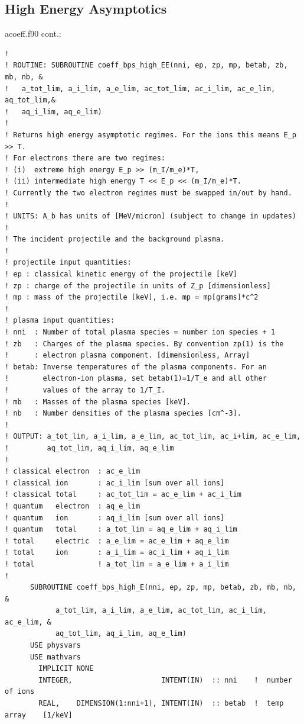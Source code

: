 \documentclass[preprint,12pt,eqsecnum,nofootinbib,amsmath,amssymb]{revtex4}
\begin{document}
\subsection{High Energy Asymptotics}

\vskip1cm 
\noindent
acoeff.f90 cont.:
{
\baselineskip 10pt
\begin{verbatim}
! 
! ROUTINE: SUBROUTINE coeff_bps_high_EE(nni, ep, zp, mp, betab, zb, mb, nb, &
!   a_tot_lim, a_i_lim, a_e_lim, ac_tot_lim, ac_i_lim, ac_e_lim, aq_tot_lim,&
!   aq_i_lim, aq_e_lim)
!
! Returns high energy asymptotic regimes. For the ions this means E_p >> T.
! For electrons there are two regimes: 
! (i)  extreme high energy E_p >> (m_I/m_e)*T,
! (ii) intermediate high energy T << E_p << (m_I/m_e)*T. 
! Currently the two electron regimes must be swapped in/out by hand.
!
! UNITS: A_b has units of [MeV/micron] (subject to change in updates)
!
! The incident projectile and the background plasma. 
!
! projectile input quantities:
! ep : classical kinetic energy of the projectile [keV]
! zp : charge of the projectile in units of Z_p [dimensionless]
! mp : mass of the projectile [keV], i.e. mp = mp[grams]*c^2
!
! plasma input quantities:
! nni  : Number of total plasma species = number ion species + 1
! zb   : Charges of the plasma species. By convention zp(1) is the 
!      : electron plasma component. [dimensionless, Array]
! betab: Inverse temperatures of the plasma components. For an
!        electron-ion plasma, set betab(1)=1/T_e and all other
!        values of the array to 1/T_I.
! mb   : Masses of the plasma species [keV]. 
! nb   : Number densities of the plasma species [cm^-3]. 
!
! OUTPUT: a_tot_lim, a_i_lim, a_e_lim, ac_tot_lim, ac_i+lim, ac_e_lim, 
!         aq_tot_lim, aq_i_lim, aq_e_lim
!
! classical electron  : ac_e_lim
! classical ion       : ac_i_lim [sum over all ions]
! classical total     : ac_tot_lim = ac_e_lim + ac_i_lim 
! quantum   electron  : aq_e_lim
! quantum   ion       : aq_i_lim [sum over all ions]
! quantum   total     : a_tot_lim = aq_e_lim + aq_i_lim
! total     electric  : a_e_lim = ac_e_lim + aq_e_lim
! total     ion       : a_i_lim = ac_i_lim + aq_i_lim
! total               ! a_tot_lim = a_e_lim + a_i_lim
!
      SUBROUTINE coeff_bps_high_E(nni, ep, zp, mp, betab, zb, mb, nb,   &
            a_tot_lim, a_i_lim, a_e_lim, ac_tot_lim, ac_i_lim, ac_e_lim, &
            aq_tot_lim, aq_i_lim, aq_e_lim)
      USE physvars
      USE mathvars      
        IMPLICIT NONE
        INTEGER,                     INTENT(IN)  :: nni    !  number of ions
        REAL,    DIMENSION(1:nni+1), INTENT(IN)  :: betab  !  temp array    [1/keV]

\end{verbatim}}
\end{document}
